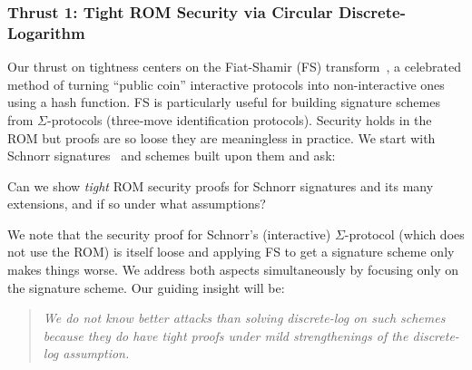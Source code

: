 \subsubsection{Thrust 1: Tight ROM Security via Circular Discrete-Logarithm}

Our thrust on tightness centers on the  Fiat-Shamir (FS) transform~\cite{C:FiaSha86}, a celebrated method of turning  ``public coin'' interactive protocols into non-interactive ones using a hash function. FS is particularly useful for building signature schemes from $\Sigma$-protocols (three-move identification protocols). Security holds in the ROM but  proofs are so  loose  they are meaningless in practice.  %
We start with  Schnorr signatures~\cite{C:Schnorr89} and schemes built upon them and ask:  %


\begin{ques} 
Can we show \emph{tight} ROM security proofs for Schnorr signatures and its many  extensions, and if so under what assumptions?
\end{ques}

\noindent We note that the security proof for Schnorr's    (interactive) $\Sigma$-protocol (which does not use the ROM) is itself loose and applying FS to get a signature scheme only makes things worse.  We address  both aspects  simultaneously by focusing only on the signature scheme. Our guiding insight will be:
\begin{quote}
   \emph{We do not know better attacks than   solving discrete-log on such schemes because they \emph{do} have tight proofs under mild  strengthenings of the discrete-log assumption.}
\end{quote}


